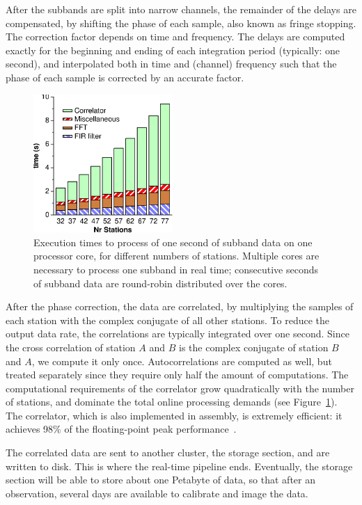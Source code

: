 \documentclass[journal]{IEEEtran}
\begin{document}
After the subbands are split into narrow channels, the remainder of the
delays are compensated, by shifting the phase of each sample, also known as
fringe stopping.
The correction factor depends on time and frequency.
The delays are computed exactly for the beginning and ending of each
integration period (typically: one second), and interpolated both in time
and (channel) frequency such that the phase of each sample is corrected by
an accurate factor.

\begin{figure}
\begin{center}
\includegraphics[width=53mm]{speed.eps}
\end{center}
\caption{Execution times to process of one second of subband data on one
processor core, for different numbers of stations.  Multiple cores are
necessary to process one subband in real time; consecutive seconds of subband
data are round-robin distributed over the cores.}
\label{fig:speed}
\end{figure}

After the phase correction, the data are correlated, by multiplying the
samples of each station with the complex conjugate of all other stations.
To reduce the output data rate, the correlations are typically integrated
over one second.
Since the cross correlation of station $A$ and $B$ is the complex conjugate
of station $B$ and $A$, we compute it only once.
Autocorrelations are computed as well, but treated separately since they
require only half the amount of computations.
The computational requirements of the correlator grow quadratically with the
number of stations, and dominate the total online processing demands (see
Figure~\ref{fig:speed}).
The correlator, which is also implemented in assembly, is extremely efficient:
it achieves 98\% of the floating-point peak performance~\cite{Romein:06}.

The correlated data are sent to another cluster, the storage section, and
are written to disk.
This is where the real-time pipeline ends.
Eventually, the storage section will be able to store about one Petabyte of
data, so that after an observation, several days are available to calibrate
and image the data.
\end{document}

